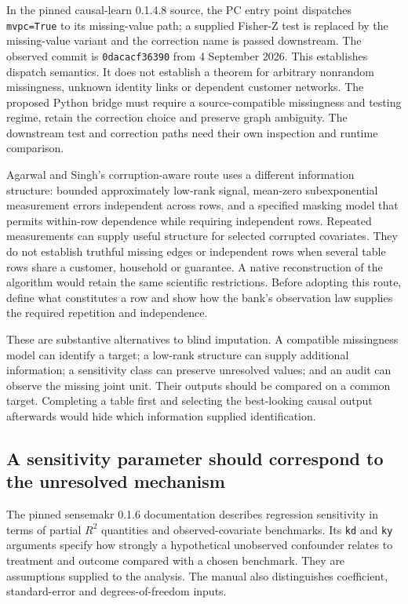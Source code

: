 In the pinned causal-learn 0.1.4.8 source, the PC entry point dispatches
\texttt{mvpc=True} to its missing-value path; a supplied Fisher-Z test is
replaced by the missing-value variant and the correction name is passed
downstream. The observed commit is \texttt{0dacacf36390} from 4 September
2026.\citep{v12_sw_causallearn} This establishes dispatch semantics. It
does not establish a theorem for arbitrary nonrandom missingness, unknown
identity links or dependent customer networks. The proposed Python bridge
must require a source-compatible missingness and testing regime, retain the
correction choice and preserve graph ambiguity. The downstream test and
correction paths need their own inspection and runtime comparison.

Agarwal and Singh's corruption-aware route uses a different information
structure: bounded approximately low-rank signal, mean-zero subexponential
measurement errors independent across rows, and a specified masking model
that permits within-row dependence while requiring independent rows.
\citep[Section 5.1, Assumptions 5.1--5.3]{corrupt2022} Repeated measurements
can supply useful structure for selected corrupted covariates. They do not
establish truthful missing edges or independent rows when several table rows
share a customer, household or guarantee. A native reconstruction of the
algorithm would retain the same scientific restrictions. Before adopting
this route, define what constitutes a row and show how the bank's observation
law supplies the required repetition and independence.

These are substantive alternatives to blind imputation. A compatible
missingness model can identify a target; a low-rank structure can supply
additional information; a sensitivity class can preserve unresolved values;
and an audit can observe the missing joint unit. Their outputs should be
compared on a common target. Completing a table first and selecting the
best-looking causal output afterwards would hide which information supplied
identification.

\subsection{A sensitivity parameter should correspond to the unresolved mechanism}

The pinned sensemakr 0.1.6 documentation describes regression sensitivity in
terms of partial $R^2$ quantities and observed-covariate benchmarks. Its
\texttt{kd} and \texttt{ky} arguments specify how strongly a hypothetical
unobserved confounder relates to treatment and outcome compared with a chosen
benchmark. They are assumptions supplied to the analysis. The manual also
distinguishes coefficient, standard-error and degrees-of-freedom inputs.
\citep{v12_sw_sensemakr}

